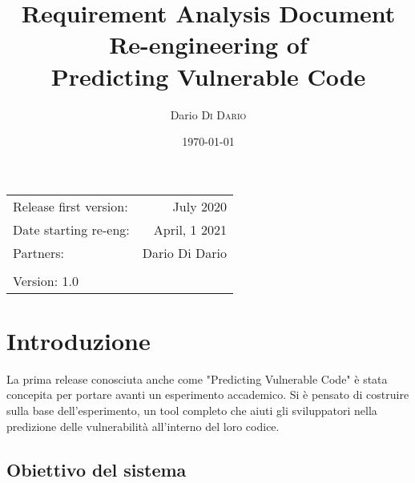 \documentclass{article}
\title{Requirement Analysis Document \\ Re-engineering of \\ Predicting Vulnerable Code} %
\author{Dario \textsc{Di Dario}} %
\date{\today} %
\begin{document}
\maketitle %

\begin{center}
\begin{tabular}{l r}
Release first version: & July 2020 \\ %
Date starting re-eng: & April, 1 2021 \\ %
Partners: & Dario Di Dario \\ %
\\
Version: 1.0 %
\end{tabular}
\end{center}



\section{Introduzione}

La prima release conosciuta anche come "Predicting Vulnerable Code" è stata concepita per portare avanti un esperimento accademico. Si è pensato di costruire sulla base dell'esperimento, un tool completo che aiuti gli sviluppatori nella predizione delle vulnerabilità all'interno del loro codice.


\subsection{Obiettivo del sistema}
\end{document}
